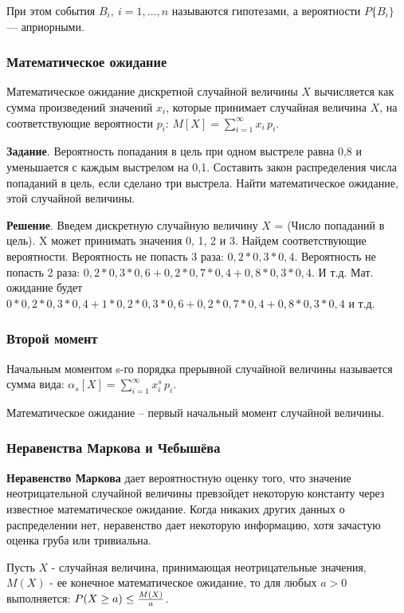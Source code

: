 \documentclass[12pt]{matmex-diploma}
\begin{document}
            При этом события $B_i,~i=1,\ldots,n$ называются гипотезами, а вероятности $P\{B_i\}$ — априорными.
            
        \subsubsection*{Математическое ожидание}
            Математическое ожидание дискретной случайной величины $X$ вычисляется как сумма произведений значений $x_i$, которые принимает случайная величина $X$, на соответствующие вероятности $p_i$: $M[X]=\sum \limits _{{i=1}}^{{\infty }}x_{i}\,p_{i}$.
            
            \textbf{Задание}. Вероятность попадания в цель при одном выстреле равна 0,8 и уменьшается с каждым выстрелом на 0,1. Составить закон распределения числа попаданий в цель, если сделано три выстрела. Найти математическое ожидание, этой случайной величины.
            
            \textbf{Решение}. Введем дискретную случайную величину $X$ = (Число попаданий в цель). X может принимать значения 0, 1, 2 и 3. Найдем соответствующие вероятности. Вероятность не попасть 3 раза: $0,2*0,3*0,4$. Вероятность не попасть 2 раза: $0,2*0,3*0,6+0,2*0,7*0,4+0,8*0,3*0,4$. И т.д. Мат. ожидание будет $0*0,2*0,3*0,4 + 1*0,2*0,3*0,6+0,2*0,7*0,4+0,8*0,3*0,4$ и т.д.
            
        \subsubsection*{Второй момент}
            Начальным моментом s-го порядка прерывной случайной величины называется сумма вида: $\alpha_s[X]=\sum \limits _{{i=1}}^{{\infty }}x_{i}^{s}\,p_{i}$.
            
            Математическое ожидание – первый начальный момент случайной величины.
            
        \subsubsection*{Неравенства Маркова и Чебышёва}
            \textbf{Неравенство Маркова} дает вероятностную оценку того, что значение неотрицательной случайной величины превзойдет некоторую константу через известное математическое ожидание. Когда никаких других данных о распределении нет, неравенство дает некоторую информацию, хотя зачастую оценка груба или тривиальна.
            
            Пусть $X$ - случайная величина, принимающая неотрицательные значения, $M(X)$ - ее конечное математическое ожидание, то для любых $a>0$ выполняется: $P(X \geq a) \leq {M(X)\over{a}}$.
            
\end{document}
